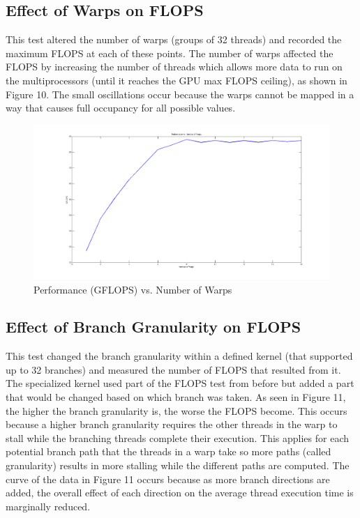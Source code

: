 \documentclass[12pt] {article}
\begin{document}
\newpage
\subsection{Effect of Warps on FLOPS}
This test altered the number of warps (groups of 32 threads) and recorded the maximum FLOPS at each of these points. The number of warps affected the FLOPS by increasing the number of threads which allows more data to run on the multiprocessors (until it reaches the GPU max FLOPS ceiling), as shown in Figure 10. The small oscillations occur because the warps cannot be mapped in a way that causes full occupancy for all possible values.

\begin{figure}[ht!]
	\centering
	\includegraphics[width=5in]{figures/warps_v_perf.png}
	\caption{Performance (GFLOPS) vs. Number of Warps}
\end{figure}
\FloatBarrier

\subsection{Effect of Branch Granularity on FLOPS}
This test changed the branch granularity within a defined kernel (that supported up to 32 branches) and measured the number of FLOPS that resulted from it. The specialized kernel used part of the FLOPS test from before but added a part that would be changed based on which branch was taken. As seen in Figure 11, the higher the branch granularity is, the worse the FLOPS become. This occurs because a higher branch granularity requires the other threads in the warp to stall while the branching threads complete their execution. This applies for each potential branch path that the threads in a warp take so more paths (called granularity) results in more stalling while the different paths are computed. The curve of the data in Figure 11 occurs because as more branch directions are added, the overall effect of each direction on the average thread execution time is marginally reduced.
\end{document}
